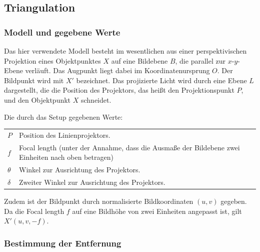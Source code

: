 \documentclass[ngerman,a4paper,parskip=half]{scrartcl}
\begin{document}


\subsection{Triangulation}

\subsubsection{Modell und gegebene Werte}

Das hier verwendete Modell besteht im wesentlichen aus einer perspektivischen Projektion eines Objektpunktes $X$ auf eine Bildebene $B$, die parallel zur $x$-$y$-Ebene verläuft. Das Augpunkt liegt dabei im Koordinatenursprung $O$. Der Bildpunkt wird mit $X'$ bezeichnet. Das projizierte Licht wird durch eine Ebene $L$ dargestellt, die die Position des Projektors, das heißt den Projektionspunkt $P$, und den Objektpunkt $X$ schneidet.

Die durch das Setup gegebenen Werte:

\begin{tabular}{lp{12cm}}
	$P$       & Position des Linienprojektors.\\
	$f$       & Focal length (unter der Annahme, dass die Ausmaße der Bildebene zwei Einheiten nach oben betragen)\\
	$\theta$  & Winkel zur Ausrichtung des Projektors.\\
	$\delta$  & Zweiter Winkel zur Ausrichtung des Projektors.
\end{tabular}

Zudem ist der Bildpunkt durch normalisierte Bildkoordinaten $(u, v)$ gegeben. Da die Focal length $f$ auf eine Bildhöhe von zwei Einheiten angepasst ist, gilt $X'(u, v, -f)$.

\subsubsection{Bestimmung der Entfernung}
\end{document}
